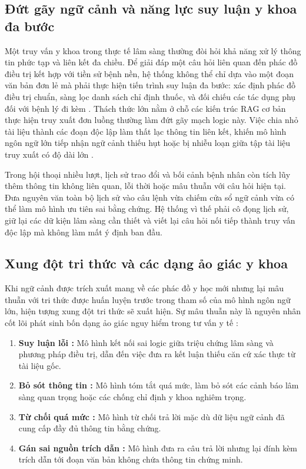 \subsection{Đứt gãy ngữ cảnh và năng lực suy luận y khoa đa bước}
Một truy vấn y khoa trong thực tế lâm sàng thường đòi hỏi khả năng xử lý thông tin phức tạp và liên kết đa chiều. Để giải đáp một câu hỏi liên quan đến phác đồ điều trị kết hợp với tiền sử bệnh nền, hệ thống không thể chỉ dựa vào một đoạn văn bản đơn lẻ mà phải thực hiện tiến trình suy luận đa bước: xác định phác đồ điều trị chuẩn, sàng lọc danh sách chỉ định thuốc, và đối chiếu các tác dụng phụ đối với bệnh lý đi kèm \cite{imedrag}. Thách thức lớn nằm ở chỗ các kiến trúc RAG cơ bản thực hiện truy xuất đơn luồng thường làm đứt gãy mạch logic này. Việc chia nhỏ tài liệu thành các đoạn độc lập làm thất lạc thông tin liên kết, khiến mô hình ngôn ngữ lớn tiếp nhận ngữ cảnh thiếu hụt hoặc bị nhiễu loạn giữa tập tài liệu truy xuất có độ dài lớn \cite{xiong2024mirage}.

Trong hội thoại nhiều lượt, lịch sử trao đổi và bối cảnh bệnh nhân còn tích lũy thêm thông tin không liên quan, lỗi thời hoặc mâu thuẫn với câu hỏi hiện tại. Đưa nguyên văn toàn bộ lịch sử vào câu lệnh vừa chiếm cửa sổ ngữ cảnh vừa có thể làm mô hình ưu tiên sai bằng chứng. Hệ thống vì thế phải cô đọng lịch sử, giữ lại các dữ kiện lâm sàng cần thiết và viết lại câu hỏi nối tiếp thành truy vấn độc lập mà không làm mất ý định ban đầu.

\subsection{Xung đột tri thức và các dạng ảo giác y khoa}
Khi ngữ cảnh được trích xuất mang về các phác đồ y học mới nhưng lại mâu thuẫn với tri thức được huấn luyện trước trong tham số của mô hình ngôn ngữ lớn, hiện tượng xung đột tri thức sẽ xuất hiện. Sự mâu thuẫn này là nguyên nhân cốt lõi phát sinh bốn dạng ảo giác nguy hiểm trong tư vấn y tế \cite{medtrustrag, xiong2024mirage}:
\begin{enumerate}[label=(\arabic*)]
    \item \textbf{Suy luận lỗi \cite{medtrustrag}:} Mô hình kết nối sai logic giữa triệu chứng lâm sàng và phương pháp điều trị, dẫn đến việc đưa ra kết luận thiếu căn cứ xác thực từ tài liệu gốc.
    \item \textbf{Bỏ sót thông tin \cite{medtrustrag}:} Mô hình tóm tắt quá mức, làm bỏ sót các cảnh báo lâm sàng quan trọng hoặc các chống chỉ định y khoa nghiêm trọng.
    \item \textbf{Từ chối quá mức \cite{medtrustrag}:} Mô hình từ chối trả lời mặc dù dữ liệu ngữ cảnh đã cung cấp đầy đủ thông tin bằng chứng.
    \item \textbf{Gán sai nguồn trích dẫn \cite{medtrustrag}:} Mô hình đưa ra câu trả lời nhưng lại đính kèm trích dẫn tới đoạn văn bản không chứa thông tin chứng minh.
\end{enumerate}

